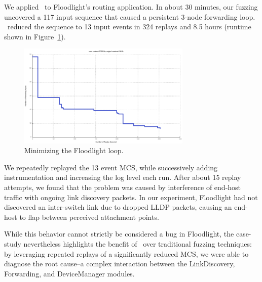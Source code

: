  We
applied \projectname~to Floodlight's routing application.
In about 30 minutes, our fuzzing uncovered a
117 input sequence that caused a persistent 3-node forwarding loop.
\projectname~reduced the sequence to 13 input events in 324 replays and 8.5
hours (runtime shown in Figure~\ref{fig:fl_loop}).

\begin{figure}[t]
    \includegraphics[width=3.25in]{../graphs/runtime/floodlight_loop.pdf}
    \caption[]{\label{fig:fl_loop} Minimizing the Floodlight loop.}
\end{figure}

We repeatedly replayed the 13 event MCS, while successively adding
instrumentation and increasing the log level each run. After about 15 replay
attempts, we found that the problem was caused by interference of end-host
traffic with ongoing link discovery packets. In our experiment, Floodlight had
not discovered an inter-switch link due to dropped LLDP packets, causing an
end-host to flap between perceived attachment points.

While this behavior cannot strictly be considered a bug in Floodlight,
the case-study nevertheless highlights the benefit of
\projectname~over traditional fuzzing techniques: by leveraging repeated replays
of a significantly reduced MCS, we were able to diagnose the root cause--a
complex interaction between the LinkDiscovery, Forwarding, and DeviceManager
modules.

